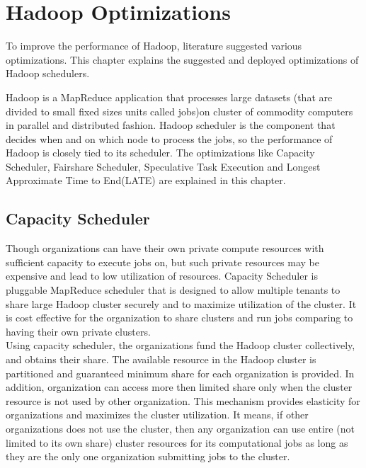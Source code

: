 
\chapter{Hadoop Optimizations} %

\label{Chapter3} %


  To improve the performance of Hadoop, literature suggested various optimizations. This chapter explains the suggested and deployed optimizations of Hadoop schedulers. 
  
  Hadoop is a MapReduce application that processes large datasets (that are divided to small fixed sizes units called jobs)on cluster of commodity computers in parallel and distributed fashion. Hadoop scheduler is the component that decides when and on which node to process the jobs, so the performance of Hadoop is closely tied to its scheduler. The optimizations like Capacity Scheduler, Fairshare Scheduler, Speculative Task Execution and Longest Approximate Time to End(LATE) are explained in this chapter. 
   
 
 
 \section{Capacity Scheduler}
 
Though organizations can have their own private compute resources with sufficient capacity to execute jobs on, but such private resources may be expensive and lead to low utilization of resources. Capacity Scheduler is pluggable MapReduce scheduler that is designed to allow multiple tenants to share large Hadoop cluster securely and to maximize utilization of the cluster. It is cost effective for the organization to share clusters and run jobs comparing to having their own private clusters.\\ 

 Using capacity scheduler, the organizations fund the Hadoop cluster collectively, and obtains their share. The available resource in the Hadoop cluster is partitioned and  guaranteed  minimum share for each organization is provided. In addition, organization can access more then limited share only when the cluster resource is not used by other organization. This mechanism provides elasticity for organizations and maximizes the cluster utilization. It means, if other organizations does not use the cluster, then any organization can use entire (not limited to its own share) cluster resources for its computational jobs as long as they are the only one organization submitting jobs to the cluster.\\
 
